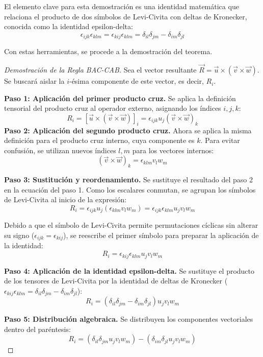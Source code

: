El elemento clave para esta demostración es una identidad matemática que relaciona el producto de dos símbolos de Levi-Civita con deltas de Kronecker, conocida como la identidad epsilon-delta:
\[ \epsilon_{ijk} \epsilon_{klm} = \epsilon_{kij} \epsilon_{klm} = \delta_{il}\delta_{jm} - \delta_{im}\delta_{jl} \]

Con estas herramientas, se procede a la demostración del teorema.

\begin{proof}[Demostración de la Regla BAC-CAB]
Sea el vector resultante $\vec{R} = \vec{u} \times (\vec{v} \times \vec{w})$. Se buscará aislar la $i$-ésima componente de este vector, es decir, $R_i$.

\textbf{Paso 1: Aplicación del primer producto cruz.}
Se aplica la definición tensorial del producto cruz al operador externo, asignando los índices $i, j, k$:
\[ R_i = [\vec{u} \times (\vec{v} \times \vec{w})]_i = \epsilon_{ijk} u_j (\vec{v} \times \vec{w})_k \]
\textbf{Paso 2: Aplicación del segundo producto cruz.}
Ahora se aplica la misma definición para el producto cruz interno, cuya componente es $k$. Para evitar confusión, se utilizan nuevos índices $l, m$ para los vectores internos:
\[ (\vec{v} \times \vec{w})_k = \epsilon_{klm} v_l w_m \]

\textbf{Paso 3: Sustitución y reordenamiento.}
Se sustituye el resultado del paso 2 en la ecuación del paso 1. Como los escalares conmutan, se agrupan los símbolos de Levi-Civita al inicio de la expresión:
\[ R_i = \epsilon_{ijk} u_j (\epsilon_{klm} v_l w_m) = \epsilon_{ijk} \epsilon_{klm} u_j v_l w_m \]

Debido a que el símbolo de Levi-Civita permite permutaciones cíclicas sin alterar su signo ($\epsilon_{ijk} = \epsilon_{kij}$), se reescribe el primer símbolo para preparar la aplicación de la identidad:
\[ R_i = \epsilon_{kij} \epsilon_{klm} u_j v_l w_m \]

\textbf{Paso 4: Aplicación de la identidad epsilon-delta.}
Se sustituye el producto de los tensores de Levi-Civita por la identidad de deltas de Kronecker ($\epsilon_{kij} \epsilon_{klm} = \delta_{il}\delta_{jm} - \delta_{im}\delta_{jl}$):
\[ R_i = (\delta_{il}\delta_{jm} - \delta_{im}\delta_{jl}) u_j v_l w_m \]

\textbf{Paso 5: Distribución algebraica.}
Se distribuyen los componentes vectoriales dentro del paréntesis:
\[ R_i = (\delta_{il}\delta_{jm} u_j v_l w_m) - (\delta_{im}\delta_{jl} u_j v_l w_m) \]


\end{proof}
